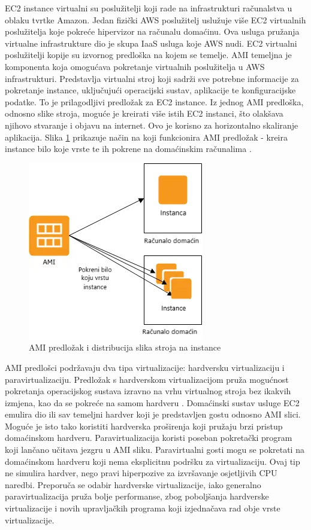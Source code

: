 EC2 instance virtualni su poslužitelji koji rade na infrastrukturi računalstva u oblaku tvrtke Amazon. Jedan fizički AWS poslužitelj uslužuje više EC2 virtualnih poslužitelja koje pokreće hipervizor na računalu domaćinu. Ova usluga pružanja virtualne infrastrukture dio je skupa IaaS usluga koje AWS nudi. EC2 virtualni poslužitelji kopije su izvornog predloška na kojem se temelje. AMI  temeljna je komponenta koja omogućava pokretanje virtualnih poslužitelja u AWS infrastrukturi. Predstavlja virtualni stroj koji sadrži sve potrebne informacije za pokretanje instance, uključujući operacijski sustav, aplikacije te konfiguracijske podatke. To je prilagodljivi predložak za EC2 instance. Iz jednog AMI predloška, odnosno slike stroja, moguće je kreirati više istih EC2 instanci, što olakšava njihovo stvaranje i objavu na internet. Ovo je korisno za horizontalno skaliranje aplikacija. Slika \ref{fig:ami} prikazuje način na koji funkcionira AMI predložak - kreira instance bilo koje vrste te ih pokrene na domaćinskim računalima \cite{ec2}.

\begin{figure}[ht]
	\centering
	\includegraphics[scale=0.6]{imgs/ami}
	\caption{AMI predložak i distribucija slika stroja na instance \cite{ec2}}
	\label{fig:ami}
\end{figure}

AMI predlošci podržavaju dva tipa virtualizacije: hardversku virtualizaciju i paravirtualizaciju. Predložak s hardverskom virtualizacijom pruža mogućnost pokretanja operacijskog sustava izravno na vrhu virtualnog stroja bez ikakvih izmjena, kao da se pokreće na samom hardveru . Domaćinski sustav usluge EC2 emulira dio ili sav temeljni hardver koji je predstavljen gostu odnosno AMI slici. Moguće je isto tako koristiti hardverska proširenja koji pružaju brzi pristup domaćinskom hardveru. Paravirtualizacija koristi poseban pokretački program koji lančano učitava jezgru u AMI sliku. Paravirtualni gosti mogu se pokretati na domaćinskom hardveru koji nema eksplicitnu podršku za virtualizaciju. Ovaj tip ne simulira hardver, nego pravi hiperpozive  za izvršavanje osjetljivih CPU naredbi. Preporuča se odabir hardverske virtualizacije, iako generalno paravirtualizacija pruža bolje performanse, zbog poboljšanja hardverske virtualizacije i novih upravljačkih programa koji izjednačava rad obje vrste virtualizacije. 

